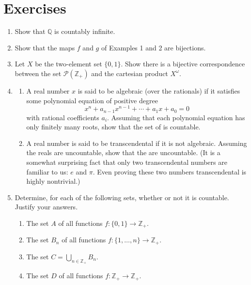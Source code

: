 \section*{Exercises}
\begin{enumerate}[itemsep=0.4em, parsep=0pt, topsep=0pt, partopsep=0pt, leftmargin=*, label=\arabic*., ref=\arabic*]
\item Show that \(\mathbb{Q}\) is countably infinite.
\item Show that the maps \(f\) and \(g\) of Examples 1 and 2 are bijections.
\item Let \(X\) be the two-element set \(\{ 0,1\}\). Show there is a bijective correspondence between the set \(\mathcal{P}(\mathbb{Z}_{+})\) and the cartesian product \(X^{\omega }\).
\item
  \begin{enumerate}[itemsep=0.2em, parsep=0pt, topsep=0pt, partopsep=0pt, leftmargin=*, label=(\alph*), align=left]
  \item A real number \(x\) is said to be algebraic (over the rationals) if it satisfies some polynomial equation of positive degree \[ x^{n} + a_{n - 1}x^{n - 1} + \cdots + a_{1}x + a_{0} = 0 \] with rational coefficients \(a_{i}\). Assuming that each polynomial equation has only finitely many roots, show that the set of  is countable.
  \item A real number is said to be transcendental if it is not algebraic. Assuming the reals are uncountable, show that the  are uncountable. (It is a somewhat surprising fact that only two transcendental numbers are familiar to us: \(e\) and \(\pi\). Even proving these two numbers transcendental is highly nontrivial.)
  \end{enumerate}
\item Determine, for each of the following sets, whether or not it is countable. Justify your answers.
  \begin{enumerate}[itemsep=0.2em, parsep=0pt, topsep=0pt, partopsep=0pt, leftmargin=*, label=(\alph*), align=left]
  \item The set \(A\) of all functions \(f : \{ 0,1\} \rightarrow {\mathbb{Z}}_{+}\).
  \item The set \(B_{n}\) of all functions \(f : \{1,\ldots, n\} \rightarrow {\mathbb{Z}}_{+}\).
  \item The set \(C = \mathop{\bigcup }\limits_{{n \in {\mathbb{Z}}_{+}}}B_{n}\).
  \item The set \(D\) of all functions \(f : \mathbb{Z}_{+} \rightarrow {\mathbb{Z}}_{+}\).

\end{enumerate}
\end{enumerate}
